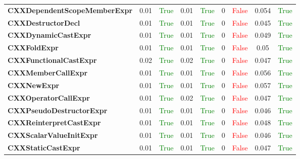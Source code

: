 \documentclass{article}
\begin{document}
\begin{xltabular}{\textwidth}{lcccccccc}
\textbf{{\fontsize{10}{12}\selectfont CXXDependentScopeMemberExpr}}& 0.01&\textcolor{green}{True}& 0.01&\textcolor{green}{True}& 0&\textcolor{red}{False}& 0.054&\textcolor{green}{True} \\[0.5ex]
\textbf{{\fontsize{10}{12}\selectfont CXXDestructorDecl}}& 0.01&\textcolor{green}{True}& 0.01&\textcolor{green}{True}& 0&\textcolor{red}{False}& 0.045&\textcolor{green}{True} \\[0.5ex]
\textbf{{\fontsize{10}{12}\selectfont CXXDynamicCastExpr}}& 0.01&\textcolor{green}{True}& 0.01&\textcolor{green}{True}& 0&\textcolor{red}{False}& 0.049&\textcolor{green}{True} \\[0.5ex]
\textbf{{\fontsize{10}{12}\selectfont CXXFoldExpr}}& 0.01&\textcolor{green}{True}& 0.01&\textcolor{green}{True}& 0&\textcolor{red}{False}& 0.05&\textcolor{green}{True} \\[0.5ex]
\textbf{{\fontsize{10}{12}\selectfont CXXFunctionalCastExpr}}& 0.02&\textcolor{green}{True}& 0.02&\textcolor{green}{True}& 0&\textcolor{red}{False}& 0.047&\textcolor{green}{True} \\[0.5ex]
\textbf{{\fontsize{10}{12}\selectfont CXXMemberCallExpr}}& 0.01&\textcolor{green}{True}& 0.01&\textcolor{green}{True}& 0&\textcolor{red}{False}& 0.056&\textcolor{green}{True} \\[0.5ex]
\textbf{{\fontsize{10}{12}\selectfont CXXNewExpr}}& 0.01&\textcolor{green}{True}& 0.01&\textcolor{green}{True}& 0&\textcolor{red}{False}& 0.057&\textcolor{green}{True} \\[0.5ex]
\textbf{{\fontsize{10}{12}\selectfont CXXOperatorCallExpr}}& 0.01&\textcolor{green}{True}& 0.02&\textcolor{green}{True}& 0&\textcolor{red}{False}& 0.047&\textcolor{green}{True} \\[0.5ex]
\textbf{{\fontsize{10}{12}\selectfont CXXPseudoDestructorExpr}}& 0.01&\textcolor{green}{True}& 0.01&\textcolor{green}{True}& 0&\textcolor{red}{False}& 0.046&\textcolor{green}{True} \\[0.5ex]
\textbf{{\fontsize{10}{12}\selectfont CXXReinterpretCastExpr}}& 0.01&\textcolor{green}{True}& 0.01&\textcolor{green}{True}& 0&\textcolor{red}{False}& 0.048&\textcolor{green}{True} \\[0.5ex]
\textbf{{\fontsize{10}{12}\selectfont CXXScalarValueInitExpr}}& 0.01&\textcolor{green}{True}& 0.01&\textcolor{green}{True}& 0&\textcolor{red}{False}& 0.046&\textcolor{green}{True} \\[0.5ex]
\textbf{{\fontsize{10}{12}\selectfont CXXStaticCastExpr}}& 0.01&\textcolor{green}{True}& 0.01&\textcolor{green}{True}& 0&\textcolor{red}{False}& 0.047&\textcolor{green}{True} \\[0.5ex]

\end{xltabular}
\end{document}
